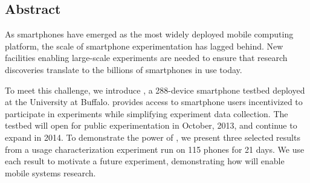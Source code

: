 \subsection*{Abstract}

As smartphones have emerged as the most widely deployed mobile computing
platform, the scale of smartphone experimentation has lagged behind. New
facilities enabling large-scale experiments are needed to ensure that
research discoveries translate to the billions of smartphones in use today.

To meet this challenge, we introduce \PhoneLab{}, a 288-device smartphone
testbed deployed at the University at Buffalo. \PhoneLab{} provides access to
smartphone users incentivized to participate in experiments while simplifying
experiment data collection. The testbed will open for public experimentation
in October, 2013, and continue to expand in 2014. To demonstrate the power of
\PhoneLab{}, we present three selected results from a usage characterization
experiment run on 115 phones for 21 days. We use each result to motivate a
future \PhoneLab{} experiment, demonstrating how \PhoneLab{} will enable
mobile systems research.
